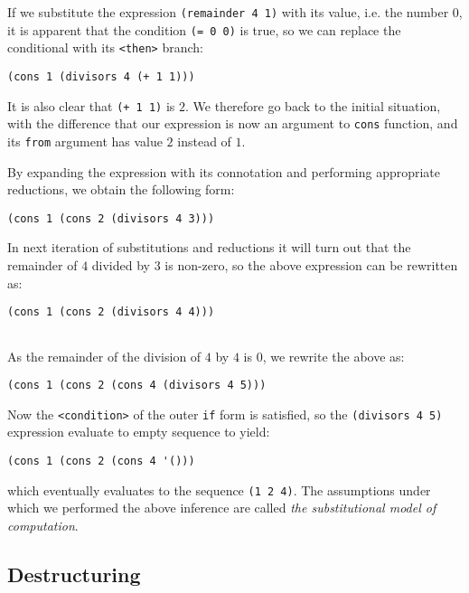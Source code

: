 If we substitute the expression \texttt{(remainder 4 1)} with
its value, i.e. the number $0$, it is apparent that the
condition \texttt{(= 0 0)} is true, so we can replace the
conditional with its \texttt{<then>} branch:

\begin{Verbatim}[samepage=true]
(cons 1 (divisors 4 (+ 1 1)))
\end{Verbatim}

It is also clear that \texttt{(+ 1 1)} is $2$. We therefore
go back to the initial situation, with the difference that
our expression is now an argument to \texttt{cons} function,
and its \texttt{from} argument has value $2$ instead of $1$.

By expanding the expression with its connotation and performing
appropriate reductions, we obtain the following form:

\begin{Verbatim}[samepage=true]
(cons 1 (cons 2 (divisors 4 3)))
\end{Verbatim}

In next iteration of substitutions and reductions it will
turn out that the remainder of $4$ divided by $3$ is non-zero,
so the above expression can be rewritten as:

\begin{Verbatim}[samepage=true]
(cons 1 (cons 2 (divisors 4 4)))


\end{Verbatim}

As the remainder of the division of $4$ by $4$ is 0, we
rewrite the above as:

\begin{Verbatim}[samepage=true]
(cons 1 (cons 2 (cons 4 (divisors 4 5)))
\end{Verbatim}

Now the \texttt{<condition>} of the outer \texttt{if} form
is satisfied, so the \texttt{(divisors 4 5)} expression evaluate
to empty sequence to yield:

\begin{Verbatim}[samepage=true]
(cons 1 (cons 2 (cons 4 '()))
\end{Verbatim}

which eventually evaluates to the sequence \texttt{(1 2 4)}.
The assumptions under which we performed the above inference
are called \textit{the substitutional model of computation}.

\subsection{Destructuring}

